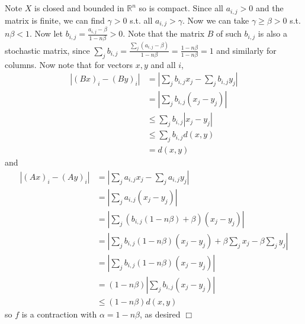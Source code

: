 \documentclass{article}
\begin{document}
\subsection{}
Note $X$ is closed and bounded in $\mathbb{R}^n$ so is compact. Since all $a_{i,j} > 0$ and the matrix is finite, we can find $\gamma > 0$ s.t. all $a_{i,j} > \gamma$. Now we can take $\gamma\geq\beta > 0$ s.t. $n\beta < 1$. Now let $b_{i,j} = \frac{a_{i,j}-\beta}{1-n\beta} > 0$. Note that the matrix $B$ of such $b_{i,j}$ is also a stochastic matrix, since $\sum\limits_{j}b_{i,j} = \frac{\sum\limits_{j}(a_{i,j} - \beta)}{1-n\beta} = \frac{1-n\beta}{1-n\beta} = 1$ and similarly for columns. Now note that for vectors $x,y$ and all $i$,
\begin{equation*}
    \begin{split}
        |(Bx)_i - (By)_i| &= |\sum\limits_{j}b_{i,j}x_j - \sum\limits_{j}b_{i,j}y_j|\\
        &= |\sum\limits_{j}b_{i,j}(x_j-y_j)|\\
        &\leq \sum\limits_{j} b_{i,j} |x_j - y_j|\\
        &\leq \sum\limits_{j} b_{i,j} d(x,y)\\
        &= d(x,y)
    \end{split}
\end{equation*}
and
\begin{equation*}
    \begin{split}
        |(Ax)_i - (Ay)_i| &= |\sum\limits_{j}a_{i,j}x_j - \sum\limits_{j}a_{i,j}y_j|\\
        &= |\sum\limits_{j}a_{i,j}(x_j-y_j)|\\
        &= |\sum\limits_{j}(b_{i,j}(1-n\beta) + \beta)(x_j-y_j)|\\
        &= |\sum\limits_{j} b_{i,j}(1-n\beta)(x_j - y_j) + \beta\sum\limits_{j} x_j - \beta\sum\limits_{j} y_j|\\
        &= |\sum\limits_{j} b_{i,j}(1-n\beta)(x_j - y_j)|\\
        &= (1-n\beta)|\sum\limits_{j}b_{i,j}(x_j-y_j)|\\
        &\leq (1-n\beta) d(x,y)
    \end{split}
\end{equation*}
so $f$ is a contraction with $\alpha = 1-n\beta$, as desired $\Box$
\end{document}
